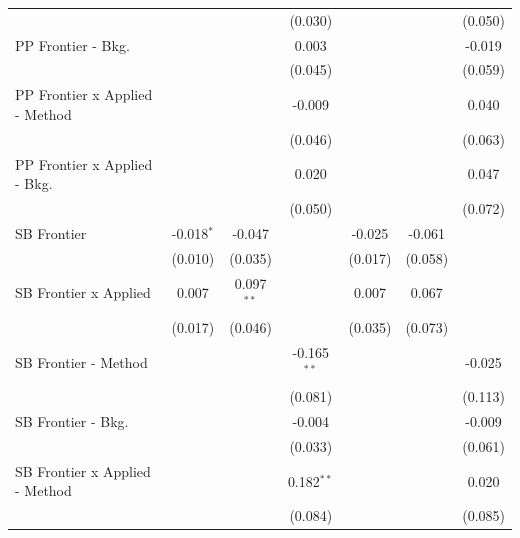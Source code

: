 \begin{tabular}{lcccccc}
                                  &              &              & (0.030)       &         &                & (0.050)\\   
   PP Frontier - Bkg.             &              &              & 0.003         &         &                & -0.019\\   
                                  &              &              & (0.045)       &         &                & (0.059)\\   
   PP Frontier x Applied - Method &              &              & -0.009        &         &                & 0.040\\   
                                  &              &              & (0.046)       &         &                & (0.063)\\   
   PP Frontier x Applied - Bkg.   &              &              & 0.020         &         &                & 0.047\\   
                                  &              &              & (0.050)       &         &                & (0.072)\\   
   SB Frontier                    & -0.018$^{*}$ & -0.047       &               & -0.025  & -0.061         &   \\   
                                  & (0.010)      & (0.035)      &               & (0.017) & (0.058)        &   \\   
   SB Frontier x Applied          & 0.007        & 0.097$^{**}$ &               & 0.007   & 0.067          &   \\   
                                  & (0.017)      & (0.046)      &               & (0.035) & (0.073)        &   \\   
   SB Frontier - Method           &              &              & -0.165$^{**}$ &         &                & -0.025\\   
                                  &              &              & (0.081)       &         &                & (0.113)\\   
   SB Frontier - Bkg.             &              &              & -0.004        &         &                & -0.009\\   
                                  &              &              & (0.033)       &         &                & (0.061)\\   
   SB Frontier x Applied - Method &              &              & 0.182$^{**}$  &         &                & 0.020\\   
                                  &              &              & (0.084)       &         &                & (0.085)\\   

\end{tabular}
